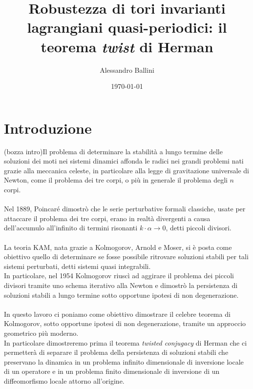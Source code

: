 \documentclass[twoside, 11pt]{amsbook}
\newcommand{\0}{{(0)}}
\newcommand{\3}{{(3)}}
\theoremstyle{colonplain}
\theoremstyle{colondefinition}
\theoremstyle{colonremark}
\numberwithin{equation}{chapter}
\begin{document}
\date{\today}
\author{Alessandro Ballini}


\title{Robustezza di tori invarianti lagrangiani quasi-periodici: il teorema \textit{twist} di Herman}

\maketitle
\tableofcontents

\chapter*{Introduzione}
(bozza intro)Il problema di determinare la stabilità a lungo termine delle soluzioni dei moti nei sistemi dinamici affonda le radici nei grandi problemi nati grazie alla meccanica celeste, in particolare alla legge di gravitazione universale di Newton, come il problema dei tre corpi, o più in generale il problema degli $n$ corpi. \\ \\
Nel 1889, Poincaré dimostrò che le serie perturbative formali classiche, usate per attaccare il problema dei tre corpi, erano in realtà divergenti a causa dell'accumulo all'infinito di termini risonanti $k \cdot \alpha \rightarrow 0$, detti piccoli divisori. \\ \\
La teoria KAM, nata grazie a Kolmogorov, Arnold e Moser, si è posta come obiettivo quello di determinare se fosse possibile ritrovare soluzioni stabili per tali sistemi perturbati, detti sistemi quasi integrabili. \\
In particolare, nel 1954 Kolmogorov riuscì ad aggirare il problema dei piccoli divisori tramite uno schema iterativo alla Newton e dimostrò la persistenza di soluzioni stabili a lungo termine sotto opportune ipotesi di non degenerazione. \\ \\
In questo lavoro ci poniamo come obiettivo dimostrare il celebre teorema di Kolmogorov, sotto opportune ipotesi di non degenerazione, tramite un approccio geometrico più moderno. \\
In particolare dimostreremo prima il teorema \textit{twisted conjugacy} di Herman che ci permetterà di separare il problema della persistenza di soluzioni stabili che preservano la dinamica in un problema infinito dimensionale di inversione locale di un operatore e in un problema finito dimensionale di inversione di un diffeomorfismo locale attorno all'origine.
\end{document}
